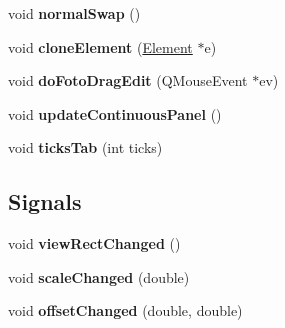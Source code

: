 \begin{DoxyCompactItemize}
void {\bfseries normal\+Swap} ()
\item 
\mbox{\label{class_ms_1_1_score_view_ad0e43e5b602ec3c2e9f6f98edb016d92}} 
void {\bfseries clone\+Element} (\hyperlink{class_ms_1_1_element}{Element} $\ast$e)
\item 
\mbox{\label{class_ms_1_1_score_view_ab7fc60dc1244d8f77849b1fd96babb95}} 
void {\bfseries do\+Foto\+Drag\+Edit} (Q\+Mouse\+Event $\ast$ev)
\item 
\mbox{\label{class_ms_1_1_score_view_ac1809e667c46e84b527ad0570b12db98}} 
void {\bfseries update\+Continuous\+Panel} ()
\item 
\mbox{\label{class_ms_1_1_score_view_a3ba0b1af7578262008529d0352bb2018}} 
void {\bfseries ticks\+Tab} (int ticks)
\end{DoxyCompactItemize}
\subsection*{Signals}
\begin{DoxyCompactItemize}
\item 
\mbox{\label{class_ms_1_1_score_view_a8191b7371168cd0255a77b40154b3e7c}} 
void {\bfseries view\+Rect\+Changed} ()
\item 
\mbox{\label{class_ms_1_1_score_view_a474b782fc3b16ee8929c79270812f562}} 
void {\bfseries scale\+Changed} (double)
\item 
\mbox{\label{class_ms_1_1_score_view_a8aa38fd92a2452a65d46b76dca331105}} 
void {\bfseries offset\+Changed} (double, double)
\end{DoxyCompactItemize}
